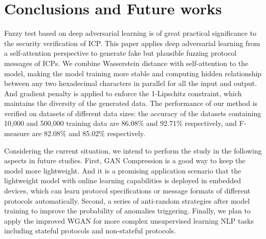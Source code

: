 \section{Conclusions and Future works}

Fuzzy test based on deep adversarial learning is of great practical significance to the security verification of ICP. This paper applies deep adversarial learning from a self-attention perspective to generate fake but plausible fuzzing protocol messages of ICPs. We combine Wasserstein distance with self-attention to the model, making the model training more stable and computing hidden relationship between any two hexadecimal characters in parallel for all the input and output. And gradient penalty is applied to enforce the 1-Lipschitz constraint, which maintains the diversity of the generated data.  The performance of our method is verified on datasets of different data sizes: the accuracy of the datasets containing 10,000 and 500,000 training data are 86.08\% and 92.71\% respectively, and F-measure are 82.08\% and 85.02\% respectively.


Considering the current situation, we intend to perform the study in the following aspects in future studies. First, GAN Compression \cite{li2020gan} is a good way to keep the model more lightweight. And it is a promising application scenario that the lightweight model with online learning capabilities is deployed in embedded devices, which can learn protocol specifications or message formats of different protocols automatically. Second, a series of anti-random strategies after model training to improve the probability of anomalies triggering. Finally, we plan to apply the improved WGAN for more complex unsupervised learning NLP tasks including stateful protocols and non-stateful protocols. 


